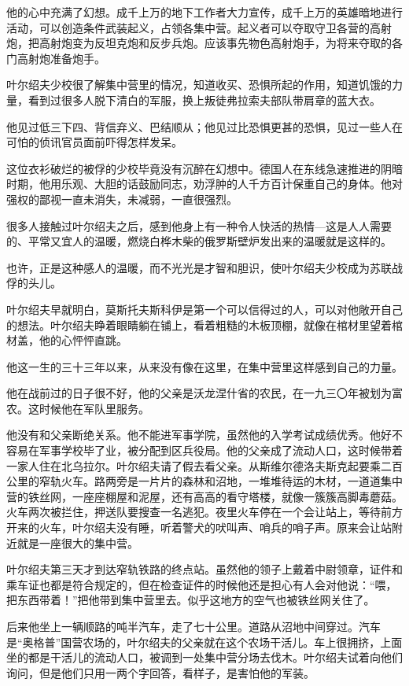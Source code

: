 他的心中充满了幻想。成千上万的地下工作者大力宣传，成千上万的英雄暗地进行活动，可以创造条件武装起义，占领各集中营。起义者可以夺取守卫各营的高射炮，把高射炮变为反坦克炮和反步兵炮。应该事先物色高射炮手，为将来夺取的各门高射炮准备炮手。

叶尔绍夫少校很了解集中营里的情况，知道收买、恐惧所起的作用，知道饥饿的力量，看到过很多人脱下清白的军服，换上叛徒弗拉索夫部队带肩章的蓝大衣。

他见过低三下四、背信弃义、巴结顺从；他见过比恐惧更甚的恐惧，见过一些人在可怕的侦讯官员面前吓得怎样发呆。

这位衣衫破烂的被俘的少校毕竟没有沉醉在幻想中。德国人在东线急速推进的阴暗时期，他用乐观、大胆的话鼓励同志，劝浮肿的人千方百计保重自己的身体。他对强权的鄙视一直未消失，未减弱，一直很强烈。

很多人接触过叶尔绍夫之后，感到他身上有一种令人快活的热情—这是人人需要的、平常又宜人的温暖，燃烧白桦木柴的俄罗斯壁炉发出来的温暖就是这样的。

也许，正是这种感人的温暖，而不光光是才智和胆识，使叶尔绍夫少校成为苏联战俘的头儿。

叶尔绍夫早就明白，莫斯托夫斯科伊是第一个可以信得过的人，可以对他敞开自己的想法。叶尔绍夫睁着眼睛躺在铺上，看着粗糙的木板顶棚，就像在棺材里望着棺材盖，他的心怦怦直跳。

他这一生的三十三年以来，从来没有像在这里，在集中营里这样感到自己的力量。

他在战前过的日子很不好，他的父亲是沃龙涅什省的农民，在一九三〇年被划为富农。这时候他在军队里服务。

他没有和父亲断绝关系。他不能进军事学院，虽然他的入学考试成绩优秀。他好不容易在军事学校毕了业，被分配到区兵役局。他的父亲成了流动人口，这时候带着一家人住在北乌拉尔。叶尔绍夫请了假去看父亲。从斯维尔德洛夫斯克起要乘二百公里的窄轨火车。路两旁是一片片的森林和沼地，一堆堆待运的木材，一道道集中营的铁丝网，一座座棚屋和泥屋，还有高高的看守塔楼，就像一簇簇高脚毒蘑菇。火车两次被拦住，押送队要搜查一名逃犯。夜里火车停在一个会让站上，等待前方开来的火车，叶尔绍夫没有睡，听着警犬的吠叫声、哨兵的哨子声。原来会让站附近就是一座很大的集中营。

叶尔绍夫第三天才到达窄轨铁路的终点站。虽然他的领子上戴着中尉领章，证件和乘车证也都是符合规定的，但在检查证件的时候他还是担心有人会对他说：“喂，把东西带着！”把他带到集中营里去。似乎这地方的空气也被铁丝网关住了。

后来他坐上一辆顺路的吨半汽车，走了七十公里。道路从沼地中间穿过。汽车是“奥格普”国营农场的，叶尔绍夫的父亲就在这个农场干活儿。车上很拥挤，上面坐的都是干活儿的流动人口，被调到一处集中营分场去伐木。叶尔绍夫试着向他们询问，但是他们只用一两个字回答，看样子，是害怕他的军装。

